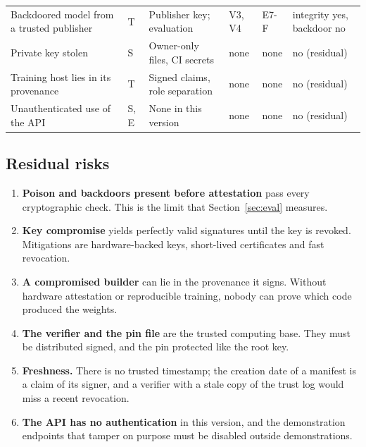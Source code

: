 {\begin{xltabular}{\textwidth}{P{4.25cm}P{0.9cm}P{3.9cm}P{1.25cm}P{1.75cm}L}
Backdoored model from a trusted publisher & T & Publisher key; evaluation & V3, V4 & E7-F & integrity yes, backdoor no \\
Private key stolen & S & Owner-only files, CI secrets & none & none & no (residual) \\
Training host lies in its provenance & T & Signed claims, role separation & none & none & no (residual) \\
Unauthenticated use of the API & S, E & None in this version & none & none & no (residual) \\
\end{xltabular}}

\subsection{Residual risks}
\begin{enumerate}
\item \textbf{Poison and backdoors present before attestation} pass every cryptographic check. This is the
  limit that Section~\ref{sec:eval} measures.
\item \textbf{Key compromise} yields perfectly valid signatures until the key is revoked. Mitigations are
  hardware-backed keys, short-lived certificates and fast revocation.
\item \textbf{A compromised builder} can lie in the provenance it signs. Without hardware attestation or
  reproducible training, nobody can prove which code produced the weights.
\item \textbf{The verifier and the pin file} are the trusted computing base. They must be distributed signed,
  and the pin protected like the root key.
\item \textbf{Freshness.} There is no trusted timestamp; the creation date of a manifest is a claim of its
  signer, and a verifier with a stale copy of the trust log would miss a recent revocation.
\item \textbf{The API has no authentication} in this version, and the demonstration endpoints that tamper on
  purpose must be disabled outside demonstrations.
\end{enumerate}
